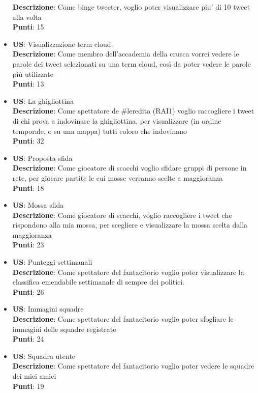 \documentclass{article}
\begin{document}
\begin{itemize}
    \textbf{Descrizione}: Come binge tweeter, voglio poter visualizzare piu' di 10 tweet alla volta \\
    \textbf{Punti}: 15
    \item \textbf{US}: Visualizzazione term cloud \\
    \textbf{Descrizione}: Come membro dell'accademia della crusca vorrei vedere le parole dei tweet selezionati su una term cloud, così da poter vedere le parole più utilizzate \\
    \textbf{Punti}: 13
    \item \textbf{US}: La ghigliottina \\
    \textbf{Descrizione}: Come spettatore de \#leredita (RAI1) voglio raccogliere i tweet di chi prova a indovinare la ghigliottina, per visualizzare (in ordine temporale, o su una mappa) tutti coloro che indovinano \\
    \textbf{Punti}: 32
    \item \textbf{US}: Proposta sfida \\
    \textbf{Descrizione}: Come giocatore di scacchi voglio sfidare gruppi di persone in rete, per giocare partite le cui mosse verranno scelte a maggioranza \\
    \textbf{Punti}: 18
    \item \textbf{US}: Mossa sfida \\
    \textbf{Descrizione}: Come giocatore di scacchi, voglio raccogliere i tweet che rispondono alla mia mossa, per scegliere e visualizzare la mossa scelta dalla maggioranza \\
    \textbf{Punti}: 23
    \item \textbf{US}: Punteggi settimanali \\
    \textbf{Descrizione}: Come spettatore del fantacitorio voglio poter visualizzare la classifica emendabile settimanale \/ di sempre dei politici. \\
    \textbf{Punti}: 26
    \item \textbf{US}: Immagini squadre \\
    \textbf{Descrizione}: Come spettatore del fantacitorio voglio poter sfogliare le immagini delle squadre registrate \\
    \textbf{Punti}: 24
    \item \textbf{US}: Squadra utente \\
    \textbf{Descrizione}: Come spettatore del fantacitorio voglio poter vedere le squadre dei miei amici \\
    \textbf{Punti}: 19
\end{itemize}
\end{document}
